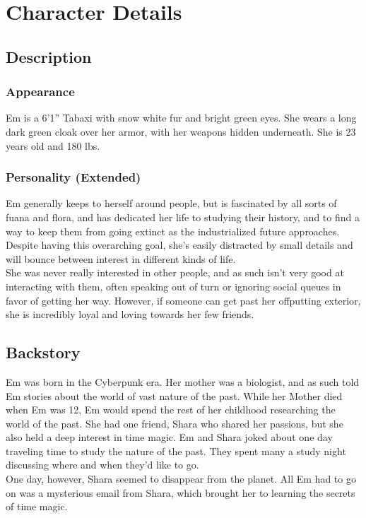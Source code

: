 \documentclass[a4paper,openany,twocolumn]{book}
\begin{document}
\onecolumn






\restoregeometry
\twocolumn

\chapter*{Character Details}

\section*{Description}
\subsection*{Appearance}
Em is a 6'1'' Tabaxi with snow white fur and bright green eyes. She wears
a long dark green cloak over her armor, with her weapons hidden underneath. She
is 23 years old and 180 lbs.
\subsection*{Personality (Extended)}
Em generally keeps to herself around people, but is fascinated by all sorts of
fuana and flora, and has dedicated her life to studying their history, and to
find a way to keep them from going extinct as the industrialized future
approaches. Despite having this overarching goal, she's easily distracted by
small details and will bounce between interest in different kinds of life. \\
She was never really interested in other people, and as such isn't very good at
interacting with them, often speaking out of turn or ignoring social queues in
favor of getting her way. However, if someone can get past her offputting
exterior, she is incredibly loyal and loving towards her few friends.
\pagebreak
\section*{Backstory}
Em was born in the Cyberpunk era. Her mother was a biologist, and as such told
Em stories about the world of vast nature of the past. While her Mother died
when Em was 12, Em would spend the rest of her childhood researching the world
of the past. She had one friend, Shara who shared her passions, but she also
held a deep interest in time magic. Em and Shara joked about one day traveling
time to study the nature of the past. They spent many a study night discussing
where and when they'd like to go. \\ One day, however, Shara seemed to disappear
from the planet. All Em had to go on was a mysterious email from Shara, which
brought her to learning the secrets of time magic.
\end{document}
